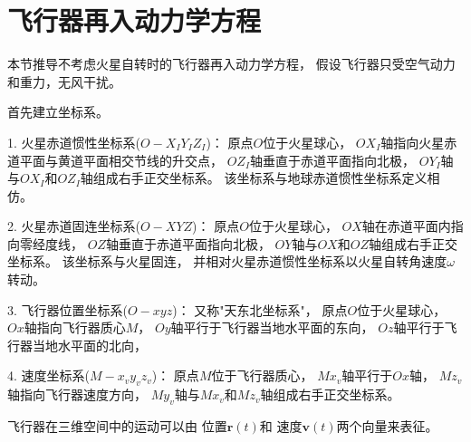 \section{飞行器再入动力学方程}
本节推导不考虑火星自转时的飞行器再入动力学方程，
假设飞行器只受空气动力和重力，无风干扰。

首先建立坐标系。

1. 火星赤道惯性坐标系($O-X_IY_IZ_I$)：
原点$O$位于火星球心，
$OX_I$轴指向火星赤道平面与黄道平面相交节线的升交点，
$OZ_I$轴垂直于赤道平面指向北极，
$OY_I$轴与$OX_I$和$OZ_I$轴组成右手正交坐标系。
该坐标系与地球赤道惯性坐标系定义相仿。

2. 火星赤道固连坐标系($O-XYZ$)：
原点$O$位于火星球心，
$OX$轴在赤道平面内指向零经度线，
$OZ$轴垂直于赤道平面指向北极，
$OY$轴与$OX$和$OZ$轴组成右手正交坐标系。
该坐标系与火星固连，
并相对火星赤道惯性坐标系以火星自转角速度$\omega$转动。

3. 飞行器位置坐标系($O-xyz$)：
又称"天东北坐标系"，
原点$O$位于火星球心，
$Ox$轴指向飞行器质心$M$，
$Oy$轴平行于飞行器当地水平面的东向，
$Oz$轴平行于飞行器当地水平面的北向，

4. 速度坐标系($M-x_vy_vz_v$)：
原点$M$位于飞行器质心，
$Mx_v$轴平行于$Ox$轴，
$Mz_v$轴指向飞行器速度方向，
$My_v$轴与$Mx_v$和$Mz_v$轴组成右手正交坐标系。

飞行器在三维空间中的运动可以由
位置$\boldsymbol{r}(t)$和
速度$\boldsymbol{v}(t)$两个向量来表征。
